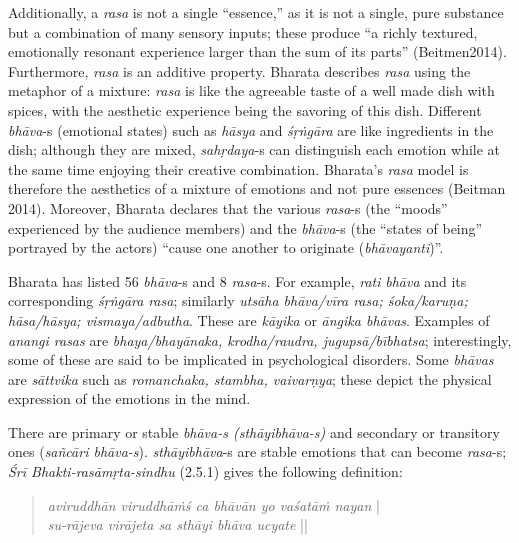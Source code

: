 Additionally, a \textsl{rasa} is not a single “essence,” as it is not a single, pure substance but a combination of many sensory inputs; these produce “a richly textured, emotionally resonant experience larger than the sum of its parts” (Beitmen2014). Furthermore, \textsl{rasa} is an additive property. Bharata describes \textsl{rasa} using the metaphor of a mixture: \textsl{rasa} is like the agreeable taste of a well made dish with spices, with the aesthetic experience being the savoring of this dish. Different \textsl{bhāva}-s (emotional states) such as \textsl{hāsya} and \textsl{śṛṅgāra} are like ingredients in the dish; although they are mixed, \textsl{sahṛdaya}-s can distinguish each emotion while at the same time enjoying their creative combination. Bharata’s \textsl{rasa} model is therefore the aesthetics of a mixture of emotions and not pure essences (Beitman 2014). Moreover, Bharata declares that the various \textsl{rasa}-s (the “moods” experienced by the audience members) and the \textsl{bhāva}-s (the “states of being” portrayed by the actors) “cause one another to originate (\textsl{bhāvayanti})”. 

Bharata has listed 56 \textsl{bhāva}-s and 8 \textsl{rasa}-s. For example, \textsl{rati} \textsl{bhāva} and its corresponding \textsl{śṛṅgāra} \textsl{rasa}; similarly \textsl{utsāha bhāva/vīra rasa; śoka/karuṇa; hāsa/hāsya; vismaya/adbutha}. These are \textsl{kāyika} or \textsl{āngika bhāvas}. Examples of \textsl{anangi rasas} are \textsl{bhaya/bhayānaka, krodha/raudra, jugupsā/bībhatsa}; interestingly, some of these are said to be implicated in psychological disorders. Some \textsl{bhāvas} are \textsl{sāttvika} such as \textsl{romanchaka, stambha, vaivarṇya}; these depict the physical expression of the emotions in the mind.

There are primary or stable \textsl{bhāva-s (sthāyibhāva-s)} and secondary or transitory ones (\textsl{sañcāri bhāva-s}). \textsl{sthāyibhāva}-s are stable emotions that can become \textsl{rasa}-s; \textsl{Śrī Bhakti-rasāmṛta-sindhu} (2.5.1) gives the following definition:
\begin{quote}
\textsl{aviruddhān viruddhāṁś ca bhāvān yo vaśatāṁ nayan} |\\
\textsl{su-rājeva virājeta sa sthāyi bhāva ucyate} ||
\end{quote}

